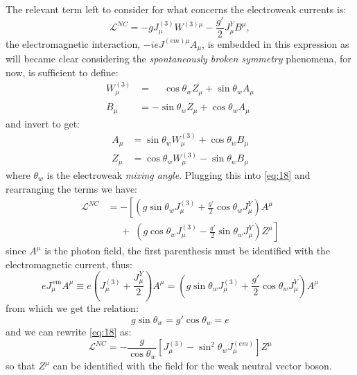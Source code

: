 The relevant term left to consider for what concerns the electroweak currents is:
\begin{equation}
  \label{eq:18}
  \mathcal{L}^{NC} = -g J_{\mu}^{(3)} W^{(3) \mu} - \frac{g'}{2}
  J_{\mu}^{Y} B^{\mu},
\end{equation}
the electromagnetic interaction, $-i e J^{(em) \mu} A_{\mu}$, is embedded in
this expression as will became clear considering the \emph{spontaneously broken
  symmetry} phenomena, for now, is sufficient to define:
\begin{equation}
  \label{eq:19}
  \begin{split}
    W^{(3)}_{\mu} &= \phantom{-} \cos \theta_{w} Z_{\mu} + \sin \theta_{w}
    A_{\mu}
    \\
    B^{\phantom{(3)}}_{\mu} &= - \sin \theta_{w} Z_{\mu} + \cos \theta_{w}
    A_{\mu}
  \end{split}
\end{equation}
and invert to get:
\begin{equation}
  \label{eq:20}
  \begin{split}
    A_{\mu} &= \sin \theta_{w} W_{\mu}^{(3)} + \cos \theta_{w} B_{\mu}
    \\
    Z_{\mu} &= \cos \theta_{w} W_{\mu}^{(3)} - \sin \theta_{w} B_{\mu}
  \end{split}
\end{equation}
where $\theta_{w}$ is the electroweak \emph{mixing angle}. Plugging this into
\cref{eq:18} and rearranging the terms we have:
\begin{equation}
  \label{eq:21}
  \begin{aligned}
    \mathcal{L}^{NC} &= - \left[ \left( g \sin \theta_{w} J_{\mu}^{(3)} +
        \frac{g'}{2} \cos \theta_{w} J_{\mu}^{Y} \right) A^{\mu} \right. \\
    &\phantom{=} + \phantom{[} \left. \left( g\cos \theta_{w} J_{\mu}^{(3)} -
        \frac{g'}{2} \sin \theta_{w} J_{\mu}^{Y} \right) Z^{\mu} \right]
  \end{aligned}
\end{equation}
since $A^{\mu}$ is the photon field, the first parenthesis must be identified
with the electromagnetic current, thus:
\begin{equation}
  \label{eq:22}
  e J_{\mu}^\mathrm{\, em} A^{\mu}
  \equiv e \left( J_{\mu}^{(3)} + \frac{J_{\mu}^{Y}}{2} \right) A^{\mu} =
  \left(g \sin \theta_{w} J_{\mu}^{(3)} + \frac{g'}{2} \cos \theta_{w}
    J_{\mu}^{Y} \right) A^{\mu}
\end{equation}
from which we get the relation:
\begin{equation}
  \label{eq:23}
  g \sin \theta_{w} = g' \cos \theta_{w} = e
\end{equation}
and we can rewrite \cref{eq:18} as:
\begin{equation}
  \label{eq:24}
  \mathcal{L}^{NC} = - \frac{g}{\cos \theta_{w}} \left[ J_{\mu}^{(3)} - \sin^{2} \theta_{w}
    J_{\mu}^{(em)} \right] Z^{\mu}
\end{equation}
so that $Z^{\mu}$ can be identified with the field for the weak neutral vector
boson.
